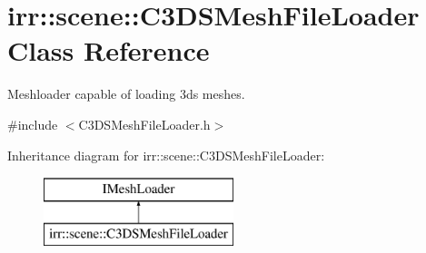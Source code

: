 \hypertarget{classirr_1_1scene_1_1_c3_d_s_mesh_file_loader}{\section{irr\-:\-:scene\-:\-:C3\-D\-S\-Mesh\-File\-Loader Class Reference}
\label{classirr_1_1scene_1_1_c3_d_s_mesh_file_loader}
}


Meshloader capable of loading 3ds meshes.  




{\ttfamily \#include $<$C3\-D\-S\-Mesh\-File\-Loader.\-h$>$}

Inheritance diagram for irr\-:\-:scene\-:\-:C3\-D\-S\-Mesh\-File\-Loader\-:\begin{figure}[H]
\begin{center}
\leavevmode
\includegraphics[height=2.000000cm]{classirr_1_1scene_1_1_c3_d_s_mesh_file_loader}
\end{center}
\end{figure}
